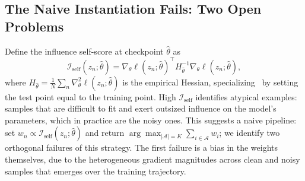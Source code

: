 \documentclass[12pt, a4paper, twoside]{book}
\numberwithin{equation}{chapter}
\theoremstyle{plain}
\theoremstyle{definition}
\theoremstyle{remark}
\newenvironment{foldable}{}{}
\begin{document}
\subsection{The Naive Instantiation Fails: Two Open Problems} \label{sec:52-research03-theory-failures}
\begin{foldable} Define the influence self-score at checkpoint $\hat{\theta}$ as
    \begin{equation}
        \mathcal{I}_\text{self}(z_n; \hat{\theta}) = \nabla_\theta \ell(z_n; \hat{\theta})^\top H_{\hat{\theta}}^{-1} \nabla_\theta \ell(z_n; \hat{\theta}),
        \label{eq:influence-self}
    \end{equation}
    where $H_{\hat{\theta}} = \frac{1}{N}\sum_n \nabla^2_\theta \ell(z_n; \hat{\theta})$ is the empirical Hessian, specializing~\cite{koh2017understanding} by setting the test point equal to the training point.
    High $\mathcal{I}_\text{self}$ identifies atypical examples: samples that are difficult to fit and exert outsized influence on the model's parameters, which in practice are the noisy ones.
    This suggests a naive pipeline: set $w_n \propto \mathcal{I}_\text{self}(z_n; \hat{\theta})$ and return $\arg\max_{|\mathcal{A}|=K} \sum_{i \in \mathcal{A}} w_i$; we identify two orthogonal failures of this strategy.
    The first failure is a bias in the weights themselves, due to the heterogeneous gradient magnitudes across clean and noisy samples that emerges over the training trajectory.
\end{foldable}
\end{document}
